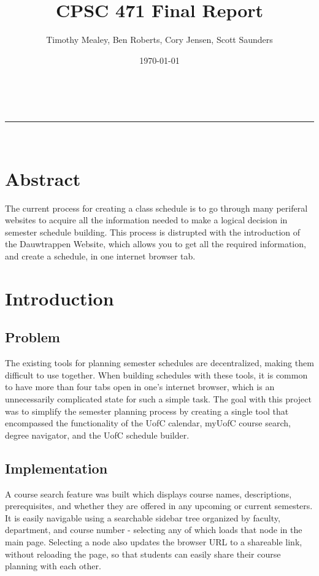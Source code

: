 \documentclass[twoside=false,a4paper,11pt]{article}
\makeatletter
\newcommand{\linia}{\rule{\linewidth}{0.5pt}}
\theoremstyle{mytheor}
\renewcommand{\maketitle}{
\begin{center}
\vspace{2ex}
{\huge \textsc{\@title}}
\vspace{1ex}
\\
\linia\\
\@author \hfill \@date
\vspace{-1ex}
\end{center}
}
\makeatother
\begin{document}
\title{CPSC 471 Final Report}
\author{Timothy Mealey, Ben Roberts, Cory Jensen, Scott Saunders}
\date{\today}
\maketitle

\section*{Abstract}

The current process for creating a class schedule is to go through many periferal websites to acquire all the information needed to make a logical decision in semester schedule building. This process is distrupted with the introduction of the Dauwtrappen Website, which allows you to get all the required information, and create a schedule, in one internet browser tab.

\section*{Introduction}

\subsection*{Problem}

The existing tools for planning semester schedules are decentralized, making them difficult to use together. When building schedules with these tools, it is common to have more than four tabs open in one's internet browser, which is an unnecessarily complicated state for such a simple task. The goal with this project was to simplify the semester planning process by creating a single tool that encompassed the functionality of the UofC calendar, myUofC course search, degree navigator, and the UofC schedule builder.

\subsection*{Implementation}

A course search feature was built which displays course names, descriptions, prerequisites, and whether they are offered in any upcoming or current semesters. It is easily navigable using a searchable sidebar tree organized by faculty, department, and course number - selecting any of which loads that node in the main page. Selecting a node also updates the browser URL to a shareable link, without reloading the page, so that students can easily share their course planning with each other.
\end{document}
